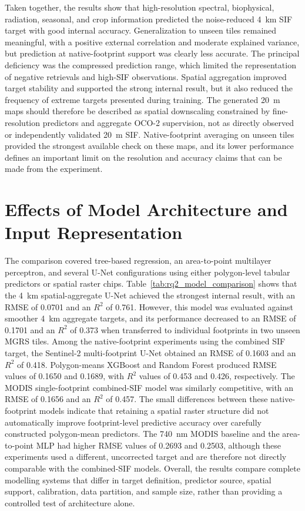 Taken together, the results show that high-resolution spectral, biophysical, radiation,
seasonal, and crop information predicted the noise-reduced 4~km SIF target with good
internal accuracy. Generalization to unseen tiles remained meaningful, with a positive
external correlation and moderate explained variance, but prediction at native-footprint
support was clearly less accurate. The principal deficiency was the compressed prediction
range, which limited the representation of negative retrievals and high-SIF observations.
Spatial aggregation improved target stability and supported the strong internal result, but
it also reduced the frequency of extreme targets presented during training. The generated
20~m maps should therefore be described as spatial downscaling constrained by fine-resolution
predictors and aggregate OCO-2 supervision, not as directly observed or independently
validated 20~m SIF. Native-footprint averaging on unseen tiles provided the strongest
available check on these maps, and its lower performance defines an important limit on the
resolution and accuracy claims that can be made from the experiment.

\section{Effects of Model Architecture and Input Representation}
The comparison covered tree-based regression, an area-to-point multilayer perceptron, and several U-Net configurations using either polygon-level tabular predictors or spatial raster chips. Table~\ref{tab:rq2_model_comparison} shows that the 4~km spatial-aggregate U-Net achieved the strongest internal result, with an RMSE of 0.0701 and an $R^2$ of 0.761. However, this model was evaluated against smoother 4~km aggregate targets, and its performance decreased to an RMSE of 0.1701 and an $R^2$ of 0.373 when transferred to individual footprints in two unseen MGRS tiles. Among the native-footprint experiments using the combined SIF target, the Sentinel-2 multi-footprint U-Net obtained an RMSE of 0.1603 and an $R^2$ of 0.418. Polygon-means XGBoost and Random Forest produced RMSE values of 0.1650 and 0.1689, with $R^2$ values of 0.453 and 0.426, respectively. The MODIS single-footprint combined-SIF model was similarly competitive, with an RMSE of 0.1656 and an $R^2$ of 0.457. The small differences between these native-footprint models indicate that retaining a spatial raster structure did not automatically improve footprint-level predictive accuracy over carefully constructed polygon-mean predictors. The 740~nm MODIS baseline and the area-to-point MLP had higher RMSE values of 0.2693 and 0.2503, although these experiments used a different, uncorrected target and are therefore not directly comparable with the combined-SIF models. Overall, the results compare complete modelling systems that differ in target definition, predictor source, spatial support, calibration, data partition, and sample size, rather than providing a controlled test of architecture alone.

